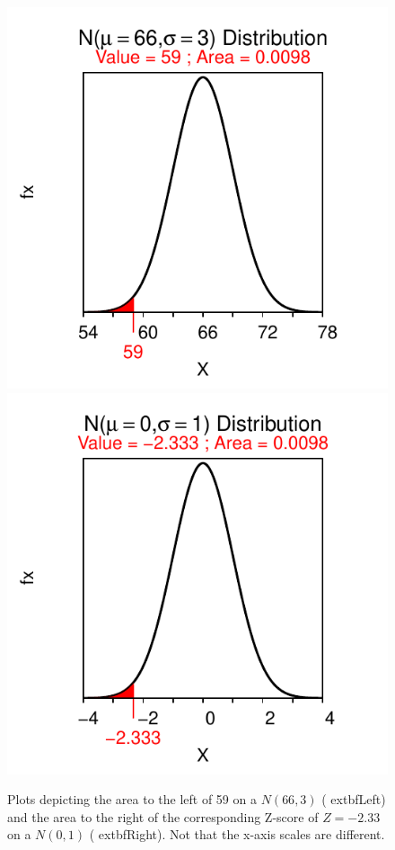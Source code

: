 \documentclass[10pt,openany]{book}\usepackage[]{graphicx}\usepackage[]{color}
\newenvironment{knitrout}{}{} %
\begin{document}
\begin{knitrout}
\color{fgcolor}\begin{figure}[hbtp]

{\centering \includegraphics[width=.4\linewidth]{Figs/NormStandardizingEx-1} 
\includegraphics[width=.4\linewidth]{Figs/NormStandardizingEx-2} 

}

\caption{Plots depicting the area to the left of 59 on a $N(66,3)$ (	extbf{Left}) and the area to the right of the corresponding Z-score of $Z=-2.33$ on a $N(0,1)$ (	extbf{Right}).  Not that the x-axis scales are different.}\label{fig:NormStandardizingEx}
\end{figure}


\end{knitrout}
\end{document}
